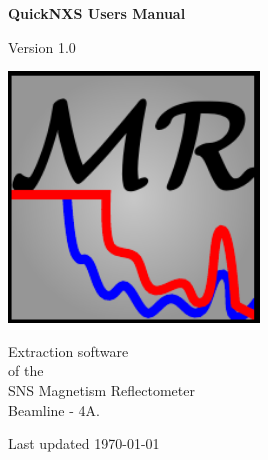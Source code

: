 \begin{titlepage}

\vspace*{0.2in}

\begin{center}
  \begin{Huge}
    \textbf{QuickNXS Users Manual}
  \end{Huge}

  \vspace*{0.3in}

  \begin{LARGE}  
    Version 1.0
  \end{LARGE}

  \vspace*{0.5in}

  \includegraphics[width=0.5\textwidth]{../../icons/logo.pdf}

  \vspace*{0.5in}
  \begin{LARGE}    
    Extraction software\\
    of the \\
    SNS Magnetism Reflectometer\\
    Beamline - 4A.
  \end{LARGE}    
    \vspace*{0.2in}
    
  \begin{large}
    Last updated \today
  \end{large}
\end{center}


 
\end{titlepage}
